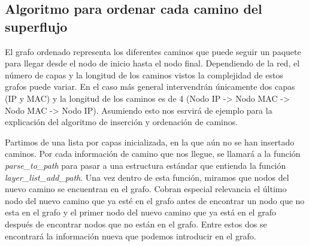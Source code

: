 \documentclass[twoside, 12pt]{epstfg}
\begin{document}

\subsection{Algoritmo para ordenar cada camino del superflujo}
El grafo ordenado representa los diferentes caminos que puede seguir un paquete para llegar desde el nodo de inicio hasta el nodo final. Dependiendo de la red, el número de capas y la longitud de los caminos vistos la complejidad de estos grafos puede variar. En el caso más general intervendrán únicamente dos capas (IP y MAC) y la longitud de los caminos es de 4 (Nodo IP -> Nodo MAC -> Nodo MAC -> Nodo IP). Asumiendo esto nos esrvirá de ejemplo para la explicación del algoritmo de inserción y ordenación de caminos.

Partimos de una lista por capas inicializada, en la que aún no se han insertado caminos. Por cada información de camino que nos llegue, se llamará a la función \textit{parse\_to\_path} para pasar a una estructura estándar que entienda la función \textit{layer\_list\_add\_path}. Una vez dentro de esta función, miramos que nodos del nuevo camino se encuentran en el grafo. Cobran especial relevancia el último nodo del nuevo camino que ya esté en el grafo antes de encontrar un nodo que no esta en el grafo y el primer nodo del nuevo camino que ya está en el grafo después de encontrar nodos  que no están en el grafo. Entre estos dos se encontrará la información nueva que podemos introducir en el grafo.
\end{document}
